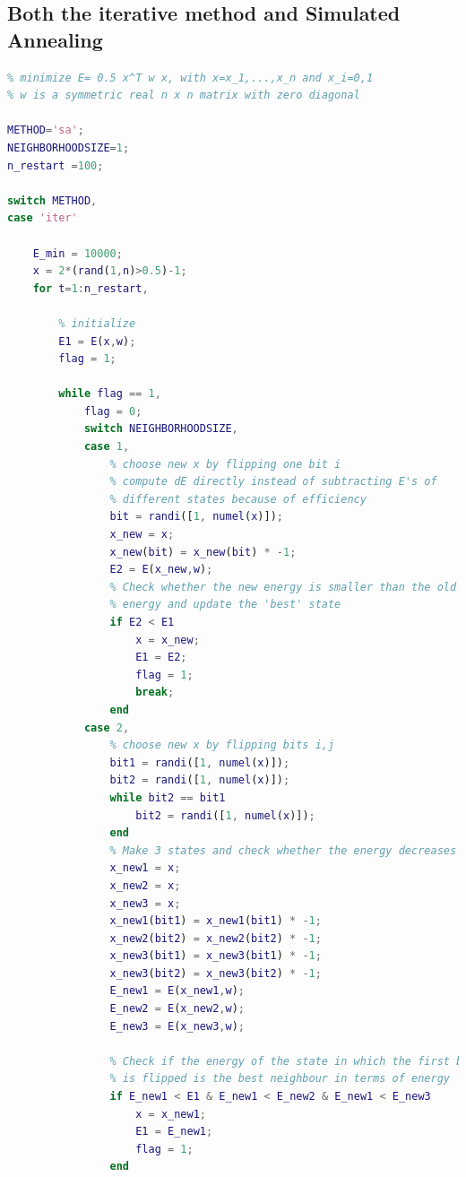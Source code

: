 \documentclass[10pt,a4paper]{article}
\begin{document}
\subsection{Both the iterative method and Simulated Annealing}
\begin{lstlisting}[language=Matlab]
% problem definition
% minimize E= 0.5 x^T w x, with x=x_1,...,x_n and x_i=0,1
% w is a symmetric real n x n matrix with zero diagonal

METHOD='sa';
NEIGHBORHOODSIZE=1;
n_restart =100;

switch METHOD,
case 'iter'

	E_min = 10000;
    x = 2*(rand(1,n)>0.5)-1;
	for t=1:n_restart,

		% initialize
		E1 = E(x,w);
		flag = 1;
	
		while flag == 1,
			flag = 0;
			switch NEIGHBORHOODSIZE,
			case 1,
				% choose new x by flipping one bit i
				% compute dE directly instead of subtracting E's of
				% different states because of efficiency
                bit = randi([1, numel(x)]);
                x_new = x;
                x_new(bit) = x_new(bit) * -1;
                E2 = E(x_new,w);
                % Check whether the new energy is smaller than the old
                % energy and update the 'best' state
                if E2 < E1
                    x = x_new;
                    E1 = E2;
                    flag = 1;
                    break;
                end
			case 2,
				% choose new x by flipping bits i,j
                bit1 = randi([1, numel(x)]);
                bit2 = randi([1, numel(x)]);
                while bit2 == bit1
                    bit2 = randi([1, numel(x)]);
                end
                % Make 3 states and check whether the energy decreases
                x_new1 = x;
                x_new2 = x;
                x_new3 = x;
                x_new1(bit1) = x_new1(bit1) * -1;
                x_new2(bit2) = x_new2(bit2) * -1;
                x_new3(bit1) = x_new3(bit1) * -1;
                x_new3(bit2) = x_new3(bit2) * -1;
                E_new1 = E(x_new1,w);
                E_new2 = E(x_new2,w);
                E_new3 = E(x_new3,w);
                
                % Check if the energy of the state in which the first bit
                % is flipped is the best neighbour in terms of energy
                if E_new1 < E1 & E_new1 < E_new2 & E_new1 < E_new3
                    x = x_new1;
                    E1 = E_new1;
                    flag = 1;
                end
                

\end{lstlisting}
\end{document}
